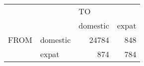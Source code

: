 \begin{table}[htbp]
     \begin{tabular}{rlrr}
          &       & \multicolumn{1}{l}{TO} &  \\
          &       & \multicolumn{1}{l}{domestic} & \multicolumn{1}{l}{expat} \\
    \multicolumn{1}{l}{FROM} & domestic & 24784 & 848 \\
          & expat & 874   & 784 \\
    \end{tabular}%
\end{table}%
